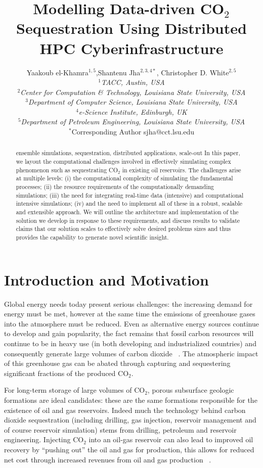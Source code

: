 \documentclass{rspublic}
\title{Modelling Data-driven CO$_{2}$ Sequestration Using Distributed HPC Cyberinfrastructure}
\author[el-khamra, jha, white]{Yaakoub el-Khamra$^{1,5}$,Shantenu Jha$^{2,3,4*}$, Christopher D. White$^{2,5}$ \\
  \small{\emph{$^{1}$TACC, Austin, USA} \\ \emph{$^{2}$Center for
      Computation \& Technology, Louisiana
      State University, USA}\\
    \emph{$^{3}$Department of Computer Science, Louisiana State University, USA}\\
    \emph{$^{4}$e-Science Institute, Edinburgh, UK} \\
    \emph{$^{5}$Department of Petroleum Engineering, Louisiana State University, USA}} \\
{\footnotesize {\hspace{0.0 in} $^*$Corresponding Author sjha@cct.lsu.edu}}}
\begin{document}
\maketitle

\begin{abstract}{ensemble simulations, sequestration, distributed
    applications, scale-out} In this paper, we layout the
  computational challenges involved in effectively simulating complex
  phenomenon such as sequestrating CO$_2$ in existing oil
  reservoirs. The challenges arise at multiple levels: (i) the
  computational complexity of simulating the fundamental processes;
  (ii) the resource requirements of the computationally demanding
  simulations; (iii) the need for integrating real-time data
  (intensive) and computational intensive simulations; (iv) and the
  need to implement all of these in a robust, scalable and extensible
  approach. We will outline the architecture and implementation of the
  solution we develop in response to these requirements, and discuss
  results to validate claims that our solution scales to effectively
  solve desired problems sizes and thus provides the capability to
  generate novel scientific insight.\end{abstract}

\section{Introduction and Motivation}

Global energy needs today present serious challenges: the increasing
demand for energy must be met, however at the same time the emissions
of greenhouse gases into the atmosphere must be reduced. Even as
alternative energy sources continue to develop and gain popularity,
the fact remains that fossil carbon resources will continue to be in
heavy use (in both developing and industrialized countries) and
consequently generate large volumes of carbon dioxide
~\citep{GeoRPT}. The atmospheric impact of this greenhouse gas can be
abated through capturing and sequestering significant fractions of the
produced CO$_2$.

For long-term storage of large volumes of CO$_2$, porous subsurface
geologic formations are ideal candidates: these are the same
formations responsible for the existence of oil and gas
reservoirs. Indeed much the technology behind carbon dioxide
sequestration (including drilling, gas injection, reservoir management
and of course reservoir simulation) stems from drilling, petroleum and
reservoir engineering. Injecting CO$_2$ into an oil-gas reservoir can
also lead to improved oil recovery by ``pushing out'' the oil and gas
for production, this allows for reduced net cost through increased
revenues from oil and gas production ~\citep{EORBook}.
\end{document}
